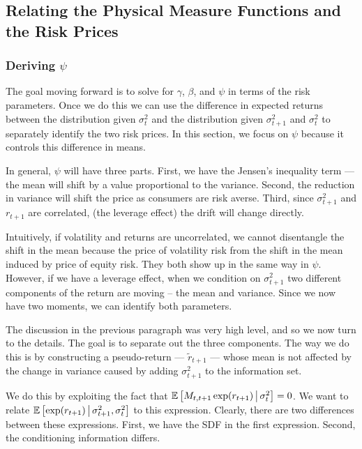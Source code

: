 \documentclass[11pt, letterpaper, twoside, final]{article}
\begin{document}
\subsection{Relating the Physical Measure Functions and the Risk Prices}

\subsubsection{Deriving \texorpdfstring{$\psi$}{psi}}

The goal moving forward is to solve for $\gamma$, $\beta$, and $\psi$ in terms of the risk parameters. 
Once we do this we can use the difference in expected returns between the distribution given $\sigma^2_t$ and the
distribution given $\sigma^2_{t+1}$ and $\sigma^2_t$ to separately identify the two risk prices.
In this section, we focus on $\psi$ because it controls this difference in means.

In general, $\psi$ will have three parts.
First, we have the Jensen's inequality term --- the mean will shift by a value proportional to the variance.
Second, the reduction in variance will shift the price as consumers are risk averse.
Third, since $\sigma^2_{t+1}$ and $r_{t+1}$ are correlated, (the leverage effect) the drift will change directly. 

Intuitively, if volatility and returns are uncorrelated, we cannot disentangle the shift in the mean because the
price of volatility risk from the shift in the mean induced by price of equity risk.
They both show up in the same way in $\psi$.
However, if we have a leverage effect, when we condition on $\sigma^2_{t+1}$ two different components of the
return are moving -- the mean and variance.
Since we now have two moments, we can identify both parameters.

The discussion in the previous paragraph was very high level, and so we now turn to the details.
The goal is to separate out the three components.
The way we do this is by constructing a pseudo-return --- $\widetilde{r}_{t+1}$ --- whose mean is not affected by
the change in variance caused by adding $\sigma^2_{t+1}$ to the information set.

We do this by exploiting the fact that $\operatorname{\mathbb{E}}\left[M_{t,t+1} \exp(r_{t+1}) \,\middle\vert\, \sigma^2_t \right] = 0$.
We want to relate $\operatorname{\mathbb{E}}\left[\exp(r_{t+1}) \,\middle\vert\, \sigma^2_{t+1}, \sigma^2_t \right]$  to this expression.
Clearly, there are two differences between these expressions.
First, we have the SDF in the first expression.
Second, the conditioning information differs.
\end{document}
